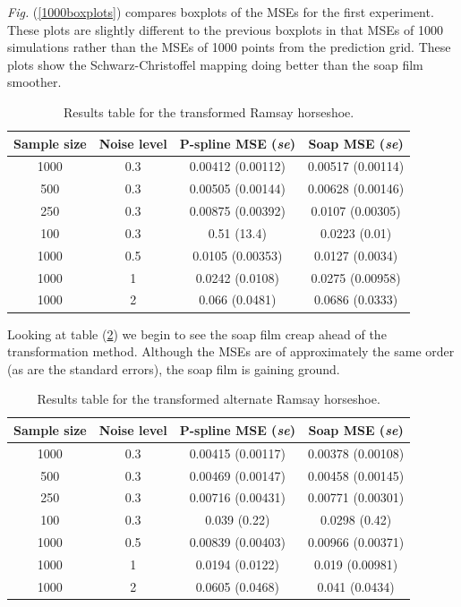 \documentclass[a4paper,10pt]{amsart}
\newcommand{\sch}{Schwarz-Christoffel }
\newcommand{\Fig}[1]{\emph{Fig.} (\ref{#1})}
\begin{document}
\Fig{1000boxplots} compares boxplots of the MSEs for the first experiment. These plots are slightly different to the previous boxplots in that MSEs of 1000 simulations rather than the MSEs of 1000 points from the prediction grid. These plots show the \sch mapping doing better than the soap film smoother.

\begin{table}[ht]
\begin{tabular}{c c c c}\\
Sample size & Noise level & P-spline MSE (\emph{se}) & Soap MSE (\emph{se}) \\
\hline
\hline
1000 & 0.3 & 0.00412 (0.00112) & 0.00517 (0.00114) \\ 
500 & 0.3 & 0.00505 (0.00144) & 0.00628 (0.00146) \\ 
250 & 0.3 & 0.00875 (0.00392) & 0.0107 (0.00305) \\ 
100 & 0.3 & 0.51 (13.4) & 0.0223 (0.01) \\ 
1000 & 0.5 & 0.0105 (0.00353) & 0.0127 (0.0034) \\ 
1000 & 1 & 0.0242 (0.0108) & 0.0275 (0.00958) \\ 
1000 & 2 & 0.066 (0.0481) & 0.0686 (0.0333) \\ 
\end{tabular}
\label{ramsayresultstable}
\caption{Results table for the transformed Ramsay horseshoe.}
\end{table}

Looking at table (\ref{altramsayresultstable}) we begin to see the soap film creap ahead of the transformation method. Although the MSEs are of approximately the same order (as are the standard errors), the soap film is gaining ground.

\begin{table}[ht]
\begin{tabular}{c c c c}\\
Sample size & Noise level & P-spline MSE (\emph{se}) & Soap MSE (\emph{se}) \\
\hline
\hline
1000 & 0.3 & 0.00415 (0.00117) & 0.00378 (0.00108) \\ 
500 & 0.3 & 0.00469 (0.00147) & 0.00458  (0.00145) \\ 
250 & 0.3 & 0.00716 (0.00431) & 0.00771  (0.00301) \\ 
100 & 0.3 & 0.039 (0.22) & 0.0298  (0.42) \\ 
1000 & 0.5 & 0.00839 (0.00403) & 0.00966 (0.00371) \\ 
1000 & 1 & 0.0194 (0.0122) & 0.019 (0.00981) \\ 
1000 & 2 & 0.0605 (0.0468) & 0.041 (0.0434) \\ 
\end{tabular}
\label{altramsayresultstable}
\caption{Results table for the transformed alternate Ramsay horseshoe.}
\end{table}
\end{document}
